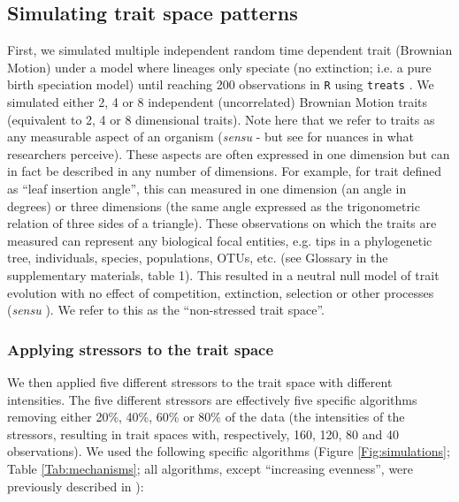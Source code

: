 \documentclass[12pt,letterpaper]{article}
\begin{document}
\subsection{Simulating trait space patterns}

First, we simulated multiple independent random time dependent trait (Brownian Motion) under a model where lineages only speciate (no extinction; i.e. a pure birth speciation model) until reaching 200 observations in \texttt{R} \citep{rcore} using \texttt{treats} \citep{guillerme2024treats}.
We simulated either 2, 4 or 8 independent (uncorrelated) Brownian Motion traits (equivalent to 2, 4 or 8 dimensional traits).
Note here that we refer to traits as any measurable aspect of an organism (\textit{sensu} \cite{mcgill2006rebuilding} - but see \cite{dawson2021traits} for nuances in what researchers perceive).
These aspects are often expressed in one dimension but can in fact be described in any number of dimensions.
For example, for trait defined as ``leaf insertion angle'', this can measured in one dimension (an angle in degrees) or three dimensions (the same angle expressed as the trigonometric relation of three sides of a triangle).
These observations on which the traits are measured can represent any biological focal entities, e.g. tips in a phylogenetic tree, individuals, species, populations, OTUs, etc. (see Glossary in the supplementary materials, table 1).
This resulted in a neutral null model of trait evolution with no effect of competition, extinction, selection or other processes (\textit{sensu} \citealt{bausman2018modeling}).
We refer to this as the ``non-stressed trait space''.

\subsubsection{Applying stressors to the trait space}

We then applied five different stressors to the trait space with different intensities.
The five different stressors are effectively five specific algorithms removing either 20\%, 40\%, 60\% or 80\% of the data (the intensities of the stressors, resulting in trait spaces with, respectively, 160, 120, 80 and 40 observations).
We used the following specific algorithms (Figure \ref{Fig:simulations}; Table \ref{Tab:mechanisms}; all algorithms, except ``increasing evenness'', were previously described in \cite{guillerme2020shifting}):
\end{document}
